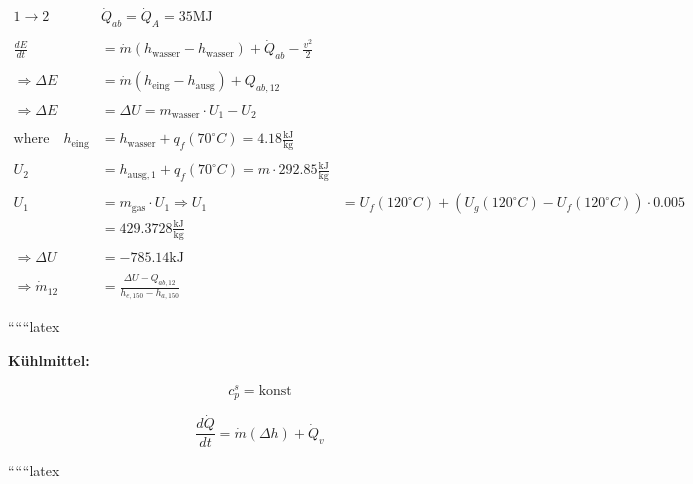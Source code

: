 \begin{align*}
1 \rightarrow 2 \quad & \dot{Q}_{ab} = \dot{Q}_A = 35 \text{MJ} \\
\\
\frac{dE}{dt} &= \dot{m} \left( h_{\text{wasser}} - h_{\text{wasser}} \right) + \dot{Q}_{ab} - \frac{v^2}{2} \\
\\
\Rightarrow \Delta E &= \dot{m} \left( h_{\text{eing}} - h_{\text{ausg}} \right) + Q_{ab,12} \\
\\
\Rightarrow \Delta E &= \Delta U = m_{\text{wasser}} \cdot U_1 - U_2 \\
\\
\text{where} \quad h_{\text{eing}} &= h_{\text{wasser}} + q_f (70^\circ C) = 4.18 \frac{\text{kJ}}{\text{kg}} \\
\\
U_2 &= h_{\text{ausg},1} + q_f (70^\circ C) = m \cdot 292.85 \frac{\text{kJ}}{\text{kg}} \\
\\
U_1 &= m_{\text{gas}} \cdot U_1 \Rightarrow U_1 &= U_f (120^\circ C) + \left( U_g (120^\circ C) - U_f (120^\circ C) \right) \cdot 0.005 \\
&= 429.3728 \frac{\text{kJ}}{\text{kg}} \\
\\
\Rightarrow \Delta U &= -785.14 \text{kJ} \\
\\
\Rightarrow \dot{m}_{12} &= \frac{\Delta U - Q_{ab,12}}{h_{e,150} - h_{a,150}}
\end{align*}

``````latex


\textbf{Kühlmittel:}

\[
c_p^s = \text{konst}
\]

\[
\frac{d\dot{Q}}{dt} = \dot{m} \left( \Delta h \right) + \dot{Q}_v
\]

``````latex